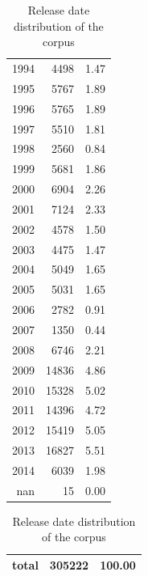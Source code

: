 \begin{description}
\begin{table}[!htb]
\begin{minipage}{.45\linewidth}
\begin{tabular}{rrr}
         1994 &    4498 &             1.47 \\
         1995 &    5767 &             1.89 \\
         1996 &    5765 &             1.89 \\
         1997 &    5510 &             1.81 \\
         1998 &    2560 &             0.84 \\
         1999 &    5681 &             1.86 \\
         2000 &    6904 &             2.26 \\
         2001 &    7124 &             2.33 \\
         2002 &    4578 &             1.50 \\
         2003 &    4475 &             1.47 \\
         2004 &    5049 &             1.65 \\
         2005 &    5031 &             1.65 \\
         2006 &    2782 &             0.91 \\
         2007 &    1350 &             0.44 \\
         2008 &    6746 &             2.21 \\
         2009 &   14836 &             4.86 \\
         2010 &   15328 &             5.02 \\
         2011 &   14396 &             4.72 \\
         2012 &   15419 &             5.05 \\
         2013 &   16827 &             5.51 \\
         2014 &    6039 &             1.98 \\
         nan &     15    &            0.00 \\ 
        \hline
        \end{tabular}
        \end{minipage}
        \begin{minipage}{1\linewidth}
        \centering
        \begin{tabular}{rrr}
        \\
        \textbf{total} & 305222 & 100.00 \\
        \hline
        \end{tabular}
        \end{minipage}
        \caption{Release date distribution of the corpus}
        \label{tab:release_dist}
        \end{table}


\end{description}
